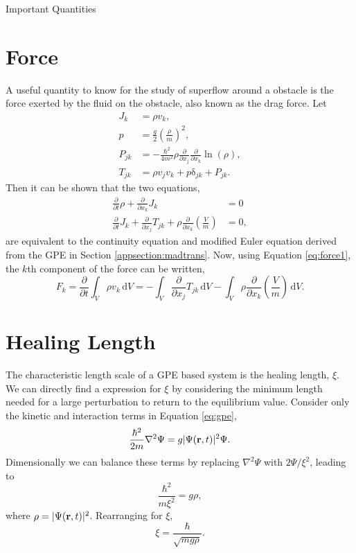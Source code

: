 \begin{chapter}{Important Quantities\label{app:ImpQuantities}}
\section{\label{appsection:force} Force}
A useful quantity to know for the study of superflow around a obstacle is the force exerted by the fluid on the obstacle, also known as the drag force. Let 
\begin{align*}
J_k &= \rho v_k,\\
p &= \frac{g}{2}\left(\frac{\rho}{m}\right)^2,\\
P_{jk} &= -\frac{\hbar^2}{4m^2} \rho \frac{\partial}{\partial x_j} \frac{\partial}{\partial x_k} \ln(\rho),\\
T_{jk} &= \rho v_j v_k + p\mathrm{\delta}_{jk} + P_{jk}.
\end{align*}
Then it can be shown that the two equations,
\begin{align}
\frac{\partial}{\partial t}\rho + \frac{\partial}{\partial x_k}J_k &= 0 \\
\frac{\partial}{\partial t}J_k + \frac{\partial}{\partial x_j}T_{jk} + \rho \frac{\partial}{\partial x_k} \left( \frac{V}{m}\right) &= 0,\label{eq:force1}
\end{align}
are equivalent to the continuity equation and modified Euler equation derived from the GPE in Section \ref{appsection:madtrans}. Now, using Equation \ref{eq:force1}, the $k$th component of the force can be written,
\begin{equation}
F_k =\frac{\partial}{\partial t} \int_V \rho v_k\,\mathrm{d}V = - \int_V \frac{\partial}{\partial x_j} T_{jk}\,\mathrm{d}V - \int_V \rho \frac{\partial}{\partial x_k} \left( \frac{V}{m} \right)\,\mathrm{d}V.
\label{eq:force}
\end{equation}

\section{\label{section:healing} Healing Length}
The characteristic length scale of a GPE based system is the healing length, $\xi$. We can directly find a expression for $\xi$ by considering the minimum length needed for a large perturbation to return to the equilibrium value. Consider only the kinetic and interaction terms in Equation \ref{eq:gpe},
\begin{equation}
  \frac{\hbar^2}{2m}\nabla^2\Psi = g|\Psi({\bf r},t)|^2\Psi.
\end{equation}
Dimensionally we can balance these terms by replacing $\nabla^2\Psi$ with $2\Psi/\xi^2$, leading to
\begin{equation}
  \frac{\hbar^2}{m\xi^2} = g\rho,
\end{equation}
where $\rho = |\Psi({\bf r},t)|^2$. Rearranging for $\xi$,
\begin{equation}
  \xi = \frac{\hbar}{\sqrt{mg\rho}}.
\end{equation}
\end{chapter}

